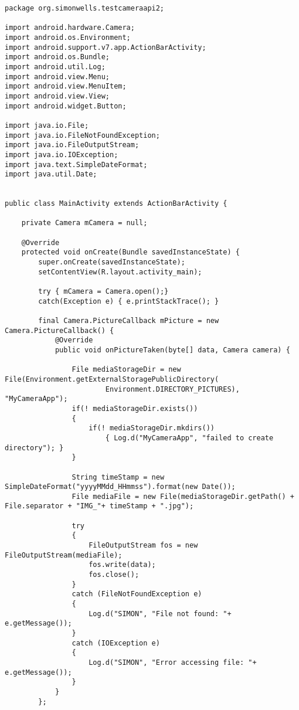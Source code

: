 \begin{lstlisting}
package org.simonwells.testcameraapi2;

import android.hardware.Camera;
import android.os.Environment;
import android.support.v7.app.ActionBarActivity;
import android.os.Bundle;
import android.util.Log;
import android.view.Menu;
import android.view.MenuItem;
import android.view.View;
import android.widget.Button;

import java.io.File;
import java.io.FileNotFoundException;
import java.io.FileOutputStream;
import java.io.IOException;
import java.text.SimpleDateFormat;
import java.util.Date;


public class MainActivity extends ActionBarActivity {

    private Camera mCamera = null;

    @Override
    protected void onCreate(Bundle savedInstanceState) {
        super.onCreate(savedInstanceState);
        setContentView(R.layout.activity_main);

        try { mCamera = Camera.open();}
        catch(Exception e) { e.printStackTrace(); }

        final Camera.PictureCallback mPicture = new Camera.PictureCallback() {
            @Override
            public void onPictureTaken(byte[] data, Camera camera) {

                File mediaStorageDir = new File(Environment.getExternalStoragePublicDirectory(
                        Environment.DIRECTORY_PICTURES), "MyCameraApp");
                if(! mediaStorageDir.exists())
                {
                    if(! mediaStorageDir.mkdirs())
                        { Log.d("MyCameraApp", "failed to create directory"); }
                }

                String timeStamp = new SimpleDateFormat("yyyyMMdd_HHmmss").format(new Date());
                File mediaFile = new File(mediaStorageDir.getPath() + File.separator + "IMG_"+ timeStamp + ".jpg");

                try
                {
                    FileOutputStream fos = new FileOutputStream(mediaFile);
                    fos.write(data);
                    fos.close();
                }
                catch (FileNotFoundException e)
                {
                    Log.d("SIMON", "File not found: "+ e.getMessage());
                }
                catch (IOException e)
                {
                    Log.d("SIMON", "Error accessing file: "+ e.getMessage());
                }
            }
        };


\end{lstlisting}
